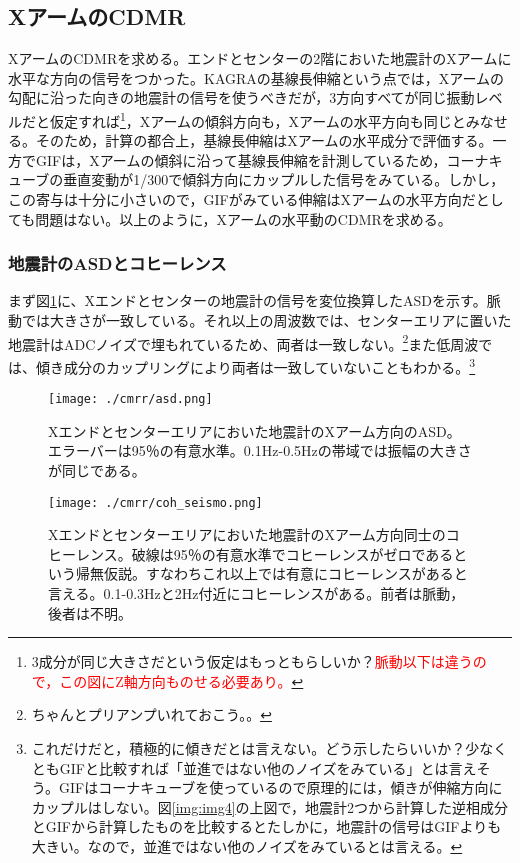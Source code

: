 \subsection{XアームのCDMR}
XアームのCDMRを求める。エンドとセンターの2階においた地震計のXアームに水平な方向の信号をつかった。KAGRAの基線長伸縮という点では，Xアームの勾配に沿った向きの地震計の信号を使うべきだが，3方向すべてが同じ振動レベルだと仮定すれば\footnote[2]{3成分が同じ大きさだという仮定はもっともらしいか？\textcolor{red}{脈動以下は違うので，この図にZ軸方向ものせる必要あり。}}，Xアームの傾斜方向も，Xアームの水平方向も同じとみなせる。そのため，計算の都合上，基線長伸縮はXアームの水平成分で評価する。一方でGIFは，Xアームの傾斜に沿って基線長伸縮を計測しているため，コーナキューブの垂直変動が1/300で傾斜方向にカップルした信号をみている。しかし，この寄与は十分に小さいので，GIFがみている伸縮はXアームの水平方向だとしても問題はない。以上のように，Xアームの水平動のCDMRを求める。

\subsubsection{地震計のASDとコヒーレンス}
まず図\ref{img:img1}に、Xエンドとセンターの地震計の信号を変位換算したASDを示す。脈動では大きさが一致している。それ以上の周波数では、センターエリアに置いた地震計はADCノイズで埋もれているため、両者は一致しない。\footnote[3]{ちゃんとプリアンプいれておこう。。}また低周波では、傾き成分のカップリングにより両者は一致していないこともわかる。\footnote[2]{これだけだと，積極的に傾きだとは言えない。どう示したらいいか？少なくともGIFと比較すれば「並進ではない他のノイズをみている」とは言えそう。GIFはコーナキューブを使っているので原理的には，傾きが伸縮方向にカップルはしない。図\ref{img:img4}の上図で，地震計2つから計算した逆相成分とGIFから計算したものを比較するとたしかに，地震計の信号はGIFよりも大きい。なので，並進ではない他のノイズをみているとは言える。}

\begin{figure}[h]
  \begin{center}
    \texttt{[image: ./cmrr/asd.png]}
  \end{center}
  \caption{Xエンドとセンターエリアにおいた地震計のXアーム方向のASD。エラーバーは95％の有意水準。0.1Hz-0.5Hzの帯域では振幅の大きさが同じである。}\label{img:img1}
\end{figure}
\begin{figure}[h]
  \begin{center}
    \texttt{[image: ./cmrr/coh\_seismo.png]}
  \end{center}
  \caption{Xエンドとセンターエリアにおいた地震計のXアーム方向同士のコヒーレンス。破線は95％の有意水準でコヒーレンスがゼロであるという帰無仮説。すなわちこれ以上では有意にコヒーレンスがあると言える。0.1-0.3Hzと2Hz付近にコヒーレンスがある。前者は脈動，後者は不明。}\label{img:img2}
\end{figure}


